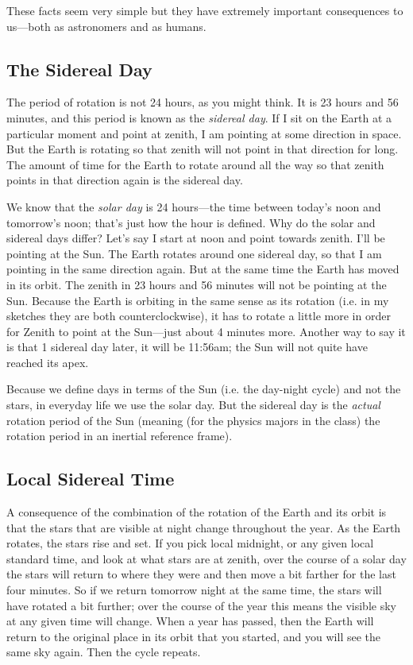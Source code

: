 \documentclass[12pt, preprint]{aastex}
\begin{document}
These facts seem very simple but they have extremely important
consequences to us---both as astronomers and as humans.

\subsection{The Sidereal Day}

The period of rotation is not 24 hours, as you might think. It is 23
hours and 56 minutes, and this period is known as the {\it sidereal
  day}. If I sit on the Earth at a particular moment and point at
zenith, I am pointing at some direction in space. But the Earth is
rotating so that zenith will not point in that direction for long.
The amount of time for the Earth to rotate around all the way so that
zenith points in that direction again is the sidereal day.

We know that the {\it solar day} is 24 hours---the time between
today's noon and tomorrow's noon; that's just how the hour is defined.
Why do the solar and sidereal days differ?  Let's say I start at noon
and point towards zenith. I'll be pointing at the Sun. The Earth
rotates around one sidereal day, so that I am pointing in the same
direction again. But at the same time the Earth has moved in its
orbit. The zenith in 23 hours and 56 minutes will not be pointing at
the Sun. Because the Earth is orbiting in the same sense as its
rotation (i.e. in my sketches they are both counterclockwise), it has
to rotate a little more in order for Zenith to point at the Sun---just
about 4 minutes more. Another way to say it is that 1 sidereal day
later, it will be 11:56am; the Sun will not quite have reached its
apex.

Because we define days in terms of the Sun (i.e. the day-night cycle)
and not the stars, in everyday life we use the solar day. But the
sidereal day is the {\it actual} rotation period of the Sun (meaning
(for the physics majors in the class) the rotation period in an
inertial reference frame).

\subsection{Local Sidereal Time}

A consequence of the combination of the rotation of the Earth and its
orbit is that the stars that are visible at night change throughout
the year. As the Earth rotates, the stars rise and set. If you pick
local midnight, or any given local standard time, and look at what
stars are at zenith, over the course of a solar day the stars will
return to where they were and then move a bit farther for the last
four minutes. So if we return tomorrow night at the same time, the
stars will have rotated a bit further; over the course of the year
this means the visible sky at any given time will change. When a year
has passed, then the Earth will return to the original place in its
orbit that you started, and you will see the same sky again. Then the
cycle repeats.
\end{document}
